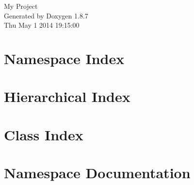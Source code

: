 \documentclass[twoside]{book}
\newcommand{\+}{\discretionary{\mbox{\scriptsize$\hookleftarrow$}}{}{}}
\newcommand{\clearemptydoublepage}{%
  \newpage{\pagestyle{empty}\cleardoublepage}%
}
\begin{document}
\hypersetup{pageanchor=false,
             bookmarks=true,
             bookmarksnumbered=true,
             pdfencoding=unicode
            }
\begin{titlepage}
\vspace*{7cm}
\begin{center}%
{\Large My Project }\\
\vspace*{1cm}
{\large Generated by Doxygen 1.8.7}\\
\vspace*{0.5cm}
{\small Thu May 1 2014 19:15:00}\\
\end{center}
\end{titlepage}
\clearemptydoublepage
\tableofcontents
\clearemptydoublepage
{}
\hypersetup{pageanchor=true}

\chapter{Namespace Index}

\chapter{Hierarchical Index}

\chapter{Class Index}

\chapter{Namespace Documentation}

\end{document}
